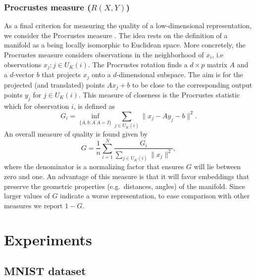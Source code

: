 \documentclass[11pt,a4paper,]{article}
\begin{document}
\hypertarget{procrustes-measure-rxy}{%
\subsubsection*{\texorpdfstring{Procrustes measure (\(R(X,Y)\))}{Procrustes measure (R(X,Y))}}\label{procrustes-measure-rxy}}

As a final criterion for measuring the quality of a low-dimensional representation, we consider the Procrustes measure \autocite{Goldberg2009-tb}. The idea rests on the definition of a manifold as a being locally isomorphic to Euclidean space. More concretely, the Procrustes measure considers observations in the neighborhood of \(x_i\), i.e observations \(x_j:j\in U_K(i)\). The Procrustes rotation finds a \(d\times p\) matrix \(A\) and a \(d\)-vector \(b\) that projects \(x_j\) onto a \(d\)-dimensional subspace. The aim is for the projected (and translated) points \(Ax_j+b\) to be close to the corresponding output points \(y_j\) for \(j\in U_K(i)\). This measure of closeness is the Procrustes statistic which for observation \(i\), is defined as
\begin{equation}\label{eq:procstats}
  G_i= \inf _{\{A,b: A^{\prime} A=I\}} \sum_{j\in U_K(i)}\|x_{j}-A y_{j}-b\|^{2}.
\end{equation}
An overall measure of quality is found given by
\begin{equation}\label{eq:procmeasure}
  G=\frac{1}{n}\sum\limits_{i=1}^N\frac{G_i}{\sum_{j\in U_K(i)}\|x_{j}\|^{2}},
\end{equation}
where the denominator is a normalizing factor that ensures \(G\) will lie between zero and one. An advantage of this measure is that it will favor embeddings that preserve the geometric properties (e.g.~distances, angles) of the manifold. Since larger values of \(G\) indicate a worse representation, to ease comparison with other measures we report \(1-G\).

\hypertarget{experiment}{%
\section{Experiments}\label{experiment}}

\hypertarget{mnist-dataset}{%
\subsection{MNIST dataset}\label{mnist-dataset}}
\end{document}
